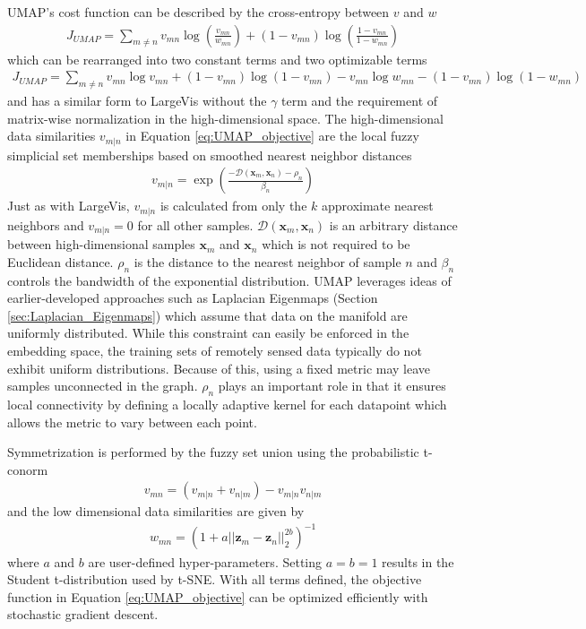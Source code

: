 UMAP's cost function can be described by the cross-entropy between $v$ and $w$
\begin{align}
	J_{UMAP} = \sum_{m \neq n} v_{mn} \log{\left( \frac{v_{mn}}{w_{mn}} \right)} + (1 - v_{mn}) \log{\left ( \frac{1 - v_{mn}}{1 - w_{mn}} \right )}
\end{align}
\noindent
which can be rearranged into two constant terms and two optimizable terms
\begin{align} \label{eq:UMAP_objective}
	J_{UMAP} = \sum_{m \neq n} v_{mn} \log{v_{mn}} + (1 - v_{mn}) \log{(1 - v_{mn})} - v_{mn} \log{w_{mn}} - (1 - v_{mn}) \log{(1 - w_{mn})}
\end{align}
\noindent
and has a similar form to LargeVis without the $\gamma$ term and the requirement of matrix-wise normalization in the high-dimensional space.  The high-dimensional data similarities $v_{m|n}$ in Equation \ref{eq:UMAP_objective} are the local fuzzy simplicial set memberships based on smoothed nearest neighbor distances
\begin{align}
	v_{m|n} = \exp{\left( \frac{-\mathcal{D}(\bm{x}_{m},\bm{x}_{n}) - \rho_{n}}{\beta_{n}} \right)}
\end{align}
\noindent
Just as with LargeVis, $v_{m|n}$ is calculated from only the $k$ approximate nearest neighbors and $v_{m|n}=0$ for all other samples.  $\mathcal{D}(\bm{x}_{m},\bm{x}_{n})$ is an arbitrary distance between high-dimensional samples $\bm{x}_{m}$ and $\bm{x}_{n}$ which is not required to be Euclidean distance.  $\rho_{n}$ is the distance to the nearest neighbor of sample $n$ and $\beta_{n}$ controls the bandwidth of the exponential  distribution.  UMAP leverages ideas of earlier-developed approaches such as Laplacian Eigenmaps (Section \ref{sec:Laplacian_Eigenmaps}) which assume that data on the manifold are uniformly distributed.  While this constraint can easily be enforced in the embedding space, the training sets of remotely sensed data typically do not exhibit uniform distributions.  Because of this, using a fixed metric may leave samples unconnected in the graph.  $\rho_{n}$ plays an important role in that it ensures local connectivity by defining a locally adaptive kernel for each datapoint which allows the metric to vary between each point.

Symmetrization is performed  by the fuzzy set union using the probabilistic t-conorm
\begin{align}
	v_{mn} = (v_{m|n} + v_{n|m}) - v_{m|n}v_{n|m}
\end{align}
\noindent
and the low dimensional data similarities are given by 
\begin{align}
	w_{mn} = (1 + a||\bm{z}_{m} - \bm{z}_{n} ||^{2b}_{2})^{-1}
\end{align}
\noindent
where $a$ and $b$ are user-defined hyper-parameters.  Setting $a=b=1$ results in the Student t-distribution used by t-SNE.  With all terms defined, the objective function in Equation \ref{eq:UMAP_objective} can be optimized efficiently with stochastic gradient descent.
  
